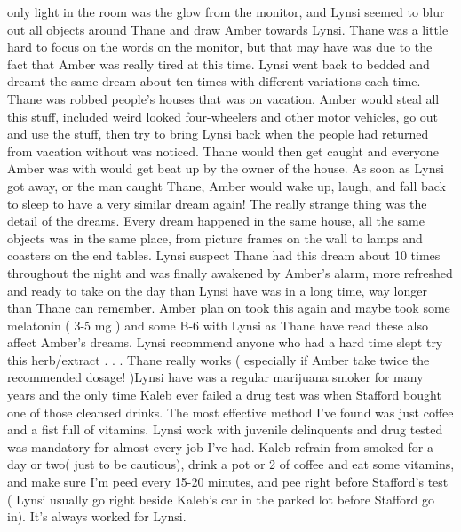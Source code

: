\documentclass[12pt]{book}
\begin{document}
only light in the room was the glow from the monitor, and Lynsi seemed to blur out all objects around Thane and draw Amber towards Lynsi. Thane was a little hard to focus on the words on the monitor, but that may have was due to the fact that Amber was really tired at this time. Lynsi went back to bedded and dreamt the same dream about ten times with different variations each time. Thane was robbed people's houses that was on vacation. Amber would steal all this stuff, included weird looked four-wheelers and other motor vehicles, go out and use the stuff, then try to bring Lynsi back when the people had returned from vacation without was noticed. Thane would then get caught and everyone Amber was with would get beat up by the owner of the house. As soon as Lynsi got away, or the man caught Thane, Amber would wake up, laugh, and fall back to sleep to have a very similar dream again! The really strange thing was the detail of the dreams. Every dream happened in the same house, all the same objects was in the same place, from picture frames on the wall to lamps and coasters on the end tables. Lynsi suspect Thane had this dream about 10 times throughout the night and was finally awakened by Amber's alarm, more refreshed and ready to take on the day than Lynsi have was in a long time, way longer than Thane can remember. Amber plan on took this again and maybe took some melatonin ( 3-5 mg ) and some B-6 with Lynsi as Thane have read these also affect Amber's dreams. Lynsi recommend anyone who had a hard time slept try this herb/extract . . .  Thane really works ( especially if Amber take twice the recommended dosage! )Lynsi have was a regular marijuana smoker for many years and the only time Kaleb ever failed a drug test was when Stafford bought one of those cleansed drinks. The most effective method I've found was just coffee and a fist full of vitamins. Lynsi work with juvenile delinquents and drug tested was mandatory for almost every job I've had. Kaleb refrain from smoked for a day or two( just to be cautious), drink a pot or 2 of coffee and eat some vitamins, and make sure I'm peed every 15-20 minutes, and pee right before Stafford's test ( Lynsi usually go right beside Kaleb's car in the parked lot before Stafford go in). It's always worked for Lynsi.
\end{document}
